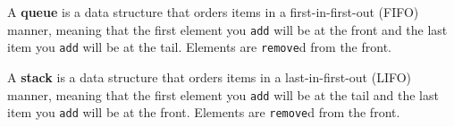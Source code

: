 A \textbf{queue} is a data structure that orders items in a first-in-first-out
(FIFO) manner, meaning that the first element you \lstinline$add$ will be at
the front and the last item you \lstinline$add$ will be at the tail. Elements
are \lstinline$remove$d from the front.

A \textbf{stack} is a data structure that orders items in a last-in-first-out
(LIFO) manner, meaning that the first element you \lstinline$add$ will be at
the tail and the last item you \lstinline$add$ will be at the front. Elements
are \lstinline$remove$d from the front.
